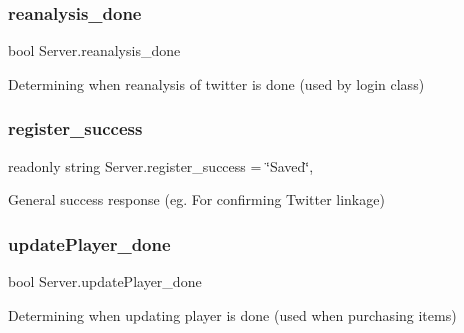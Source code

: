 \mbox{\label{class_server_a42280d186d88088d0f060ccb02974ae9}} 
\subsubsection{\texorpdfstring{reanalysis\_done}{reanalysis\_done}}
{\footnotesize\ttfamily bool Server.\+reanalysis\+\_\+done\hspace{0.3cm}{\ttfamily [static]}}



Determining when reanalysis of twitter is done (used by login class) 

\mbox{\label{class_server_a2e16618d6f2b9f4308203f4053d54545}} 
\subsubsection{\texorpdfstring{register\_success}{register\_success}}
{\footnotesize\ttfamily readonly string Server.\+register\+\_\+success = \char`\"{}Saved\char`\"{}\hspace{0.3cm}{\ttfamily [static]}, {\ttfamily [private]}}



General success response (eg. For confirming Twitter linkage) 

\mbox{\label{class_server_acf78dae58011f4406003d79e6df7e3ef}} 
\subsubsection{\texorpdfstring{updatePlayer\_done}{updatePlayer\_done}}
{\footnotesize\ttfamily bool Server.\+update\+Player\+\_\+done\hspace{0.3cm}{\ttfamily [static]}}



Determining when updating player is done (used when purchasing items) 

\mbox{\label{class_server_a0d876aba3addd4f76cf9d998f0552048}} 
